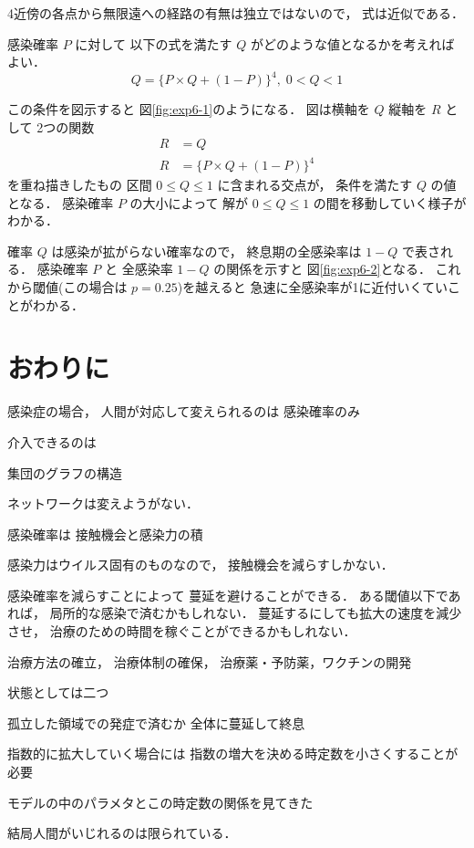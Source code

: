 \documentclass[10pt,oneside]{scrartcl}
\begin{document}
4近傍の各点から無限遠への経路の有無は独立ではないので，
式は近似である．


感染確率 \(P\) に対して
以下の式を満たす \(Q\) がどのような値となるかを考えればよい．
\begin{equation}
  Q=\{P\times Q + (1-P)\}^{4},\;0<Q<1
\end{equation}

\begin{figure}%
  \centering
  \myGraph*{}
\end{figure}

この条件を図示すると
図\ref{fig:exp6-1}のようになる．
図は横軸を \(Q\)
縦軸を \(R\) として
2つの関数
\begin{align}
  R&=Q\\
  R&=\{P\times Q + (1-P)\}^{4}
\end{align}
を重ね描きしたもの
区間 \(0\le Q\le 1\) に含まれる交点が，
条件を満たす \(Q\) の値となる．
感染確率 \(P\) の大小によって
解が \(0\le Q\le 1\) の間を移動していく様子がわかる．

\begin{figure}%
  \centering
  \myGraph*{}
\end{figure}

確率 \(Q\) は感染が拡がらない確率なので，
終息期の全感染率は \(1-Q\) で表される．
感染確率 \(P\) と 
全感染率 \(1-Q\) の関係を示すと
図\ref{fig:exp6-2}となる．
これから閾値(この場合は \(p=0.25\))を越えると
急速に全感染率が1に近付いくていことがわかる．

\section{おわりに}
\label{sec:org4f22a23}

感染症の場合，
人間が対応して変えられるのは
感染確率のみ

介入できるのは

集団のグラフの構造

ネットワークは変えようがない．

感染確率は
接触機会と感染力の積

感染力はウイルス固有のものなので，
接触機会を減らすしかない．

感染確率を減らすことによって
蔓延を避けることができる．
ある閾値以下であれば，
局所的な感染で済むかもしれない．
蔓延するにしても拡大の速度を減少させ，
治療のための時間を稼ぐことができるかもしれない．

治療方法の確立，
治療体制の確保，
治療薬・予防薬，ワクチンの開発

状態としては二つ

孤立した領域での発症で済むか
全体に蔓延して終息

指数的に拡大していく場合には
指数の増大を決める時定数を小さくすることが必要

モデルの中のパラメタとこの時定数の関係を見てきた

結局人間がいじれるのは限られている．
\end{document}
